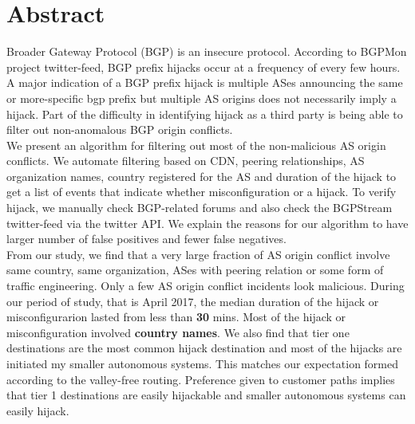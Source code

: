  \section{Abstract}\label{sec:abstract}
Broader Gateway Protocol (BGP) is an insecure protocol. According to BGPMon project twitter-feed, BGP prefix hijacks occur at a frequency of every few hours. A major indication of a BGP prefix hijack is multiple ASes announcing the same or more-specific bgp prefix but multiple AS origins does not necessarily imply a hijack. Part of the difficulty in identifying hijack as a third party is being able to filter out non-anomalous BGP origin conflicts.\\
We present an algorithm for filtering out most of the non-malicious AS origin conflicts. We automate filtering based on CDN, peering relationships, AS organization names, country registered for the AS and duration of the hijack to get a list of events that indicate whether misconfiguration or a hijack. To verify hijack, we manually check BGP-related forums and also check the BGPStream twitter-feed via the twitter API. We explain the reasons for our algorithm to have larger number of false positives and fewer false negatives. \\
From our study, we find that a very large fraction of AS origin conflict involve same country, same organization, ASes with peering relation or some form of traffic engineering. Only a few AS origin conflict incidents look malicious. During our period of study, that is April 2017, the median duration of the hijack or misconfigurarion lasted from less than \textbf{30 }mins. Most of the hijack or misconfiguration involved  \textbf{country names}. We also find that tier one destinations are the most common hijack destination and most of the hijacks are initiated my smaller autonomous systems. This matches our expectation formed according to the valley-free routing. Preference given to customer paths implies that tier 1 destinations are easily hijackable and smaller autonomous systems can easily hijack. 